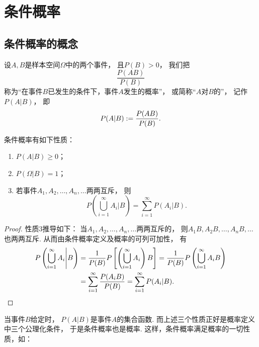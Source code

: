 \section{条件概率}
\subsection{条件概率的概念}
\begin{definition}\label{definition:条件概率.条件概率的概念}
设\(A,B\)是样本空间\(\Omega\)中的两个事件，
且\(P(B) > 0\)，
我们把\begin{equation*}
	\frac{P(AB)}{P(B)}
\end{equation*}称为“在事件\(B\)已发生的条件下，事件\(A\)发生的概率”，
或简称“\(A\)对\(B\)的”，
记作\(P(A \vert B)\)，
即\begin{equation}
	P(A \vert B)
	:=
	\frac{P(AB)}{P(B)}.
\end{equation}
\end{definition}

\begin{property}
条件概率有如下性质：
\begin{enumerate}
	\item \(P(A \vert B) \geq 0\)；

	\item \(P(\Omega \vert B) = 1\)；

	\item 若事件\(A_1,A_2,\dotsc,A_n,\dotsc\)两两互斥，
	则\begin{equation*}
		P\left(\bigcup_{i=1}^\infty A_i \Bigg\vert B\right)
		= \sum_{i=1}^\infty {P(A_i \vert B)}.
	\end{equation*}
\end{enumerate}
\begin{proof}
性质3推导如下：
当\(A_1,A_2,\dotsc,A_n,\dotsc\)两两互斥的，
则\(A_1 B,A_2 B,\dotsc,A_n B,\dotsc\)也两两互斥.
从而由条件概率定义及概率的可列可加性，
有\begin{align*}
	P\left(\bigcup_{i=1}^\infty A_i \Bigg\vert B\right)
	&= \frac{1}{P(B)} P\left[\left(\displaystyle\bigcup_{i=1}^\infty A_i\right) B\right]
	= \frac{1}{P(B)} P\left(\displaystyle\bigcup_{i=1}^\infty {A_i B}\right) \\
	&= \sum_{i=1}^\infty {\frac{P(A_i B)}{P(B)}}
	= \sum_{i=1}^\infty {P(A_i \vert B)}.
	\qedhere
\end{align*}
\end{proof}
\end{property}

当事件\(B\)给定时，
\(P(A \vert B)\)是事件\(A\)的集合函数.
而上述三个性质正好是概率定义中三个公理化条件，
于是条件概率也是概率.
这样，条件概率满足概率的一切性质，如：

